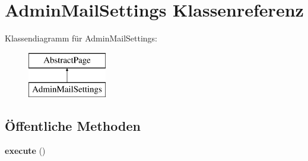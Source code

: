\hypertarget{class_admin_mail_settings}{}\section{Admin\+Mail\+Settings Klassenreferenz}
\label{class_admin_mail_settings}
Klassendiagramm für Admin\+Mail\+Settings\+:\begin{figure}[H]
\begin{center}
\leavevmode
\includegraphics[height=2.000000cm]{class_admin_mail_settings}
\end{center}
\end{figure}
\subsection*{Öffentliche Methoden}
\begin{DoxyCompactItemize}
\item 
\mbox{\label{class_admin_mail_settings_a27247f0ed527cfc349383cbd1a614285}} 
{\bfseries execute} ()
\end{DoxyCompactItemize}
